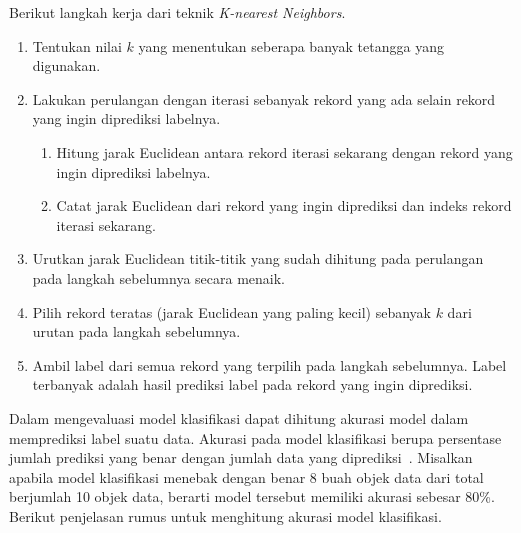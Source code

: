 Berikut langkah kerja dari teknik \textit{K-nearest Neighbors}.
\begin{enumerate}
	\item Tentukan nilai \(k\) yang menentukan seberapa banyak tetangga yang digunakan.
	\item Lakukan perulangan dengan iterasi sebanyak rekord yang ada selain rekord yang ingin diprediksi labelnya.
	\begin{enumerate}
		\item Hitung jarak Euclidean antara rekord iterasi sekarang dengan rekord yang ingin diprediksi labelnya.
		\item Catat jarak Euclidean dari rekord yang ingin diprediksi dan indeks rekord iterasi sekarang.
	\end{enumerate}
	\item Urutkan jarak Euclidean titik-titik yang sudah dihitung pada perulangan pada langkah sebelumnya secara menaik.
	\item Pilih rekord teratas (jarak Euclidean yang paling kecil) sebanyak \(k\) dari urutan pada langkah sebelumnya.
	\item Ambil label dari semua rekord yang terpilih pada langkah sebelumnya. Label terbanyak adalah hasil prediksi label pada rekord yang ingin diprediksi.
\end{enumerate}

Dalam mengevaluasi model klasifikasi dapat dihitung akurasi model dalam memprediksi label suatu data. Akurasi pada model klasifikasi berupa persentase jumlah prediksi yang benar dengan jumlah data yang diprediksi~\cite{jiawei:12:datmin}. Misalkan apabila model klasifikasi menebak dengan benar 8 buah objek data dari total berjumlah 10 objek data, berarti model tersebut memiliki akurasi sebesar 80\%. Berikut penjelasan rumus untuk menghitung akurasi model klasifikasi.

